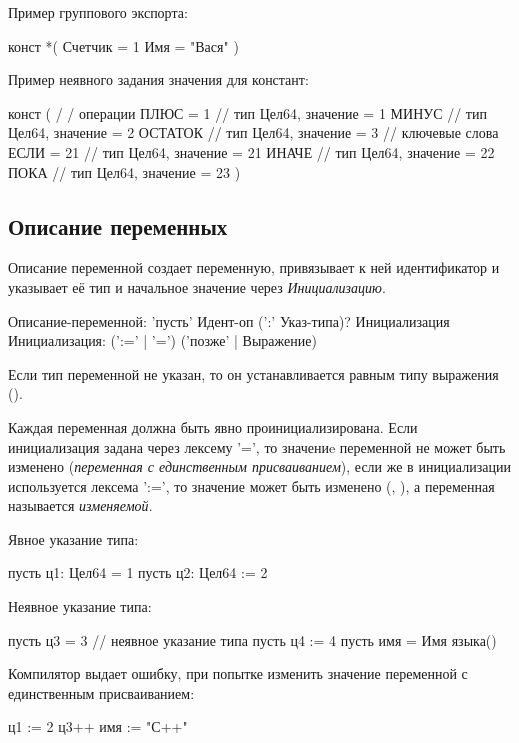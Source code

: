 Пример группового экспорта:
\begin{Trivil}[vspace=2pt]
конст *(
    Счетчик = 1
    Имя = "Вася"
)
\end{Trivil}

Пример неявного задания значения для констант:
\begin{Trivil}[vspace=2pt]
конст ( 
    / / операции
    ПЛЮС = 1   // тип Цел64, значение = 1
    МИНУС       // тип Цел64, значение = 2  
    ОСТАТОК   // тип Цел64, значение = 3 
    // ключевые слова
    ЕСЛИ = 21   // тип Цел64, значение = 21
    ИНАЧЕ        // тип Цел64, значение = 22
    ПОКА          // тип Цел64, значение = 23
)
\end{Trivil}


\hypertarget{variables}{%
\subsection{Описание переменных}\label{decls:variables}}

Описание переменной создает переменную, привязывает к ней идентификатор и указывает её тип и начальное значение через \emph{Инициализацию}. 

\begin{Grammar}
Описание-переменной: 
    'пусть' Идент-оп (':' Указ-типа)? Инициализация
Инициализация: (':=' | '=') ('позже' | Выражение)
\end{Grammar} 

Если тип переменной не указан, то он устанавливается равным типу выражения ().

Каждая переменная должна быть явно проинициализирована.
Если инициализация задана через лексему '=', то значениe переменной не может быть изменено (\emph{переменная с единственным присваиванием}), 
если же в инициализации используется лексема ':=', то значение может быть изменено (, ), а переменная называется \emph{изменяемой}.

Явное указание типа:
\begin{Trivil}[vspace=2pt]
пусть ц1: Цел64 = 1 
пусть ц2: Цел64 := 2
\end{Trivil}

Неявное указание типа:
\begin{Trivil}[vspace=2pt]
пусть ц3 = 3   // неявное указание типа
пусть ц4 := 4
пусть имя = Имя языка() 
\end{Trivil}

Компилятор выдает ошибку, при попытке изменить значение переменной с единственным присваиванием:
\begin{SampleErr}[vspace=2pt]
    ц1 := 2 
    ц3++
    имя := "С++"
\end{SampleErr}

